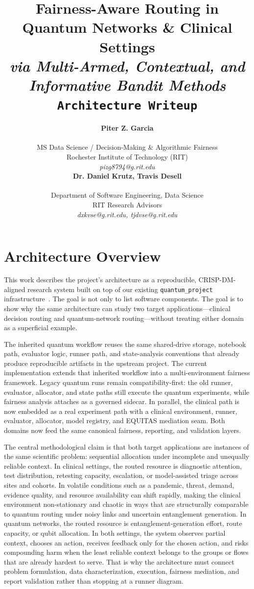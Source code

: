 \documentclass{IEEEtran}
\title{{\LARGE\textbf{Fairness-Aware Routing in Quantum Networks \& Clinical Settings}}\\
{\Large\textit{via Multi-Armed, Contextual, and Informative Bandit Methods}}\\
{\large\texttt{Architecture Writeup}}}
\author{%
\begin{minipage}{0.48\textwidth}
\begin{center}
{\bf Piter Z. Garcia}\\
\begin{small}
MS Data Science / Decision-Making \& Algorithmic Fairness\\
Rochester Institute of Technology (RIT)\\
{\it pizg8794@g.rit.edu}
\end{small}
\end{center}
\end{minipage}
\hfill
\begin{minipage}{0.48\textwidth}
\begin{center}
{\bf Dr. Daniel Krutz, Travis Desell}\\
\begin{small}
Department of Software Engineering, Data Science\\
RIT Research Advisors\\
{\it dxkvse@g.rit.edu, tjdvse@g.rit.edu}
\end{small}
\end{center}
\end{minipage}%
}
\begin{document}
\maketitle

\section{Architecture Overview}

This work describes the project's architecture as a reproducible, CRISP-DM-aligned research system built on top of our existing \texttt{quantum\_project} infrastructure~\cite{quantumproject}. The goal is not only to list software components. The goal is to show why the same architecture can study two target applications---clinical decision routing and quantum-network routing---without treating either domain as a superficial example.

The inherited quantum workflow reuses the same shared-drive storage, notebook path, evaluator logic, runner path, and state-analysis conventions that already produce reproducible artifacts in the upstream project. The current implementation extends that inherited workflow into a multi-environment fairness framework. Legacy quantum runs remain compatibility-first: the old runner, evaluator, allocator, and state paths still execute the quantum experiments, while fairness analysis attaches as a governed sidecar. In parallel, the clinical path is now embedded as a real experiment path with a clinical environment, runner, evaluator, allocator, model registry, and EQUITAS mediation seam. Both domains now feed the same canonical fairness, reporting, and validation layers.

The central methodological claim is that both target applications are instances of the same scientific problem: sequential allocation under incomplete and unequally reliable context. In clinical settings, the routed resource is diagnostic attention, test distribution, retesting capacity, escalation, or model-assisted triage across sites and cohorts. In volatile conditions such as a pandemic, threat, demand, evidence quality, and resource availability can shift rapidly, making the clinical environment non-stationary and chaotic in ways that are structurally comparable to quantum routing under noisy links and uncertain entanglement generation. In quantum networks, the routed resource is entanglement-generation effort, route capacity, or qubit allocation. In both settings, the system observes partial context, chooses an action, receives feedback only for the chosen action, and risks compounding harm when the least reliable context belongs to the groups or flows that are already hardest to serve. That is why the architecture must connect problem formulation, data characterization, execution, fairness mediation, and report validation rather than stopping at a runner diagram.
\end{document}
